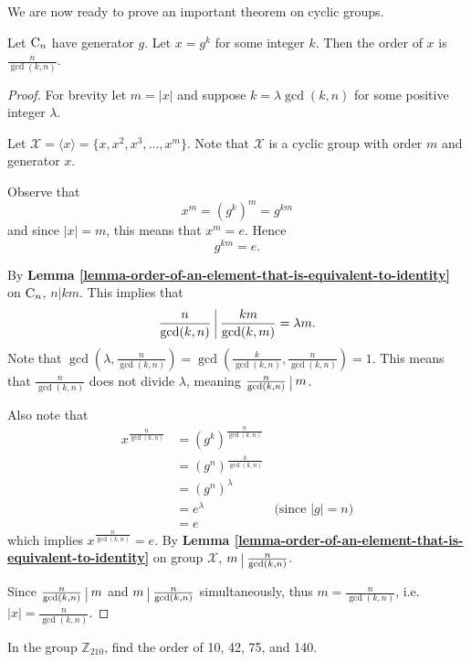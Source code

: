 We are now ready to prove an important theorem on cyclic groups.
\begin{theorem}\label{thrm-order-of-element-in-cyclic-group}
    Let $\mathrm{C}_{n}$ have generator $g$. Let $x = g^k$ for some integer $k$. Then the order of $x$ is $\frac{n}{\gcd(k,n)}$.
\end{theorem}
\begin{proof}
    For brevity let $m = |x|$ and suppose $k = \lambda \gcd(k, n)$ for some positive integer $\lambda$.

    Let $\mathcal{X} = \langle x \rangle = \{x, x^2, x^3, \dots, x^m\}$. Note that $\mathcal{X}$ is a cyclic group with order $m$ and generator $x$.

    Observe that
    \[
        x^m = \left(g^k\right)^m = g^{km}
    \]
    and since $|x| = m$, this means that $x^m = e$. Hence
    \[
        g^{km} = e.
    \]

    By \textbf{Lemma \ref{lemma-order-of-an-element-that-is-equivalent-to-identity}} on $\mathrm{C}_{n}$, $n \vert km$. This implies that
    \[
        \frac{n}{\gcd(k,n)} \ \vline \ \frac{km}{\gcd(k,m)}    = \lambda m.
    \]
    Note that $\gcd\left(\lambda, \frac{n}{\gcd(k,n)}\right) = \gcd\left(\frac{k}{\gcd(k,n)}, \frac{n}{\gcd(k,n)}\right) = 1$. This means that $\frac{n}{\gcd(k,n)}$ does not divide $\lambda$, meaning $\frac{n}{\gcd(k,n)} \ \vline \ m$.

    Also note that
    \begin{align*}
        x^{\frac{n}{\gcd(k,n)}} &= \left(g^k\right)^{\frac{n}{\gcd(k,n)}}\\
        &= \left(g^n\right)^{\frac{k}{\gcd(k,n)}}\\
        &= \left(g^n\right)^\lambda\\
        &= e^\lambda & \text{(since } |g| = n)\\
        &= e
    \end{align*}
    which implies $x^{\frac{n}{\gcd(k,n)}} = e$. By \textbf{Lemma \ref{lemma-order-of-an-element-that-is-equivalent-to-identity}} on group $\mathcal{X}$, $m \ \vline \ \frac{n}{\gcd(k,n)}$.

    Since $\frac{n}{\gcd(k,n)} \ \vline \ m$ and $m \ \vline \ \frac{n}{\gcd(k,n)}$ simultaneously, thus $m = \frac{n}{\gcd(k,n)}$, i.e. $|x| = \frac{n}{\gcd(k,n)}$.
\end{proof}

\begin{exercise}
    In the group $\mathbb{Z}_{210}$, find the order of 10, 42, 75, and 140.
\end{exercise}

